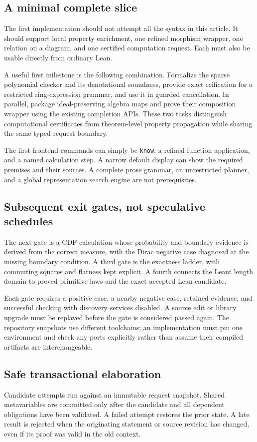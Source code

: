 \documentclass[11pt,a4paper]{article}
\newcommand{\code}[1]{\nolinkurl{#1}}
\theoremstyle{plain}
\theoremstyle{definition}
\theoremstyle{remark}
\begin{document}
\subsection{A minimal complete slice}
The first implementation should not attempt all the syntax in this article.
It should support local property enrichment, one refined morphism wrapper,
one relation on a diagram, and one certified computation request. Each must
also be usable directly from ordinary Lean.

A useful first milestone is the following combination. Formalize the sparse
polynomial checker and its denotational soundness, provide exact reification
for a restricted ring-expression grammar, and use it in guarded cancellation.
In parallel, package ideal-preserving algebra maps and prove their composition
wrapper using the existing completion APIs. These two tasks distinguish
computational certificates from theorem-level property propagation while
sharing the same typed request boundary.

The first frontend commands can simply be \code{know}, a refined function
application, and a named calculation step. A narrow default display can show
the required premises and their sources. A complete prose grammar, an
unrestricted planner, and a global representation search engine are not
prerequisites.

\subsection{Subsequent exit gates, not speculative schedules}
The next gate is a CDF calculation whose probability and boundary evidence is
derived from the correct measure, with the Dirac negative case diagnosed at
the missing boundary condition. A third gate is the exactness ladder, with
commuting squares and flatness kept explicit. A fourth connects the Leant
length domain to proved primitive laws and the exact accepted Lean candidate.

Each gate requires a positive case, a nearby negative case, retained evidence,
and successful checking with discovery services disabled. A source edit or
library upgrade must be replayed before the gate is considered passed again.
The repository snapshots use different toolchains; an implementation must pin
one environment and check any ports explicitly rather than assume their
compiled artifacts are interchangeable.

\subsection{Safe transactional elaboration}
Candidate attempts run against an immutable request snapshot. Shared
metavariables are committed only after the candidate and all dependent
obligations have been validated. A failed attempt restores the prior state.
A late result is rejected when the originating statement or source revision
has changed, even if its proof was valid in the old context.
\end{document}
